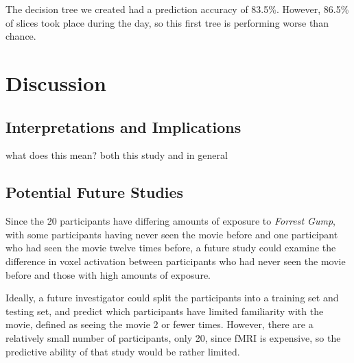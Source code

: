 The decision tree we created had a prediction accuracy of 83.5\%.  However,
86.5\% of slices took place during the day, so this first tree is performing
worse than chance.

\section{Discussion}

\subsection{Interpretations and Implications}
what does this mean? both this study and in general
\subsection{Potential Future Studies}

Since the 20 participants have differing amounts of exposure to \emph{Forrest 
Gump}, with some participants having never seen the movie before and one 
participant who had seen the movie twelve times before, a future study could 
examine the difference in voxel activation between participants who had never 
seen the movie before and those with high amounts of exposure.

Ideally, a future investigator could split the participants into a training
set and testing set, and predict which participants have limited familiarity
with the movie, defined as seeing the movie 2 or fewer times.  However, there
are a relatively small number of participants, only 20, since fMRI is
expensive, so the predictive ability of that study would be rather limited.






